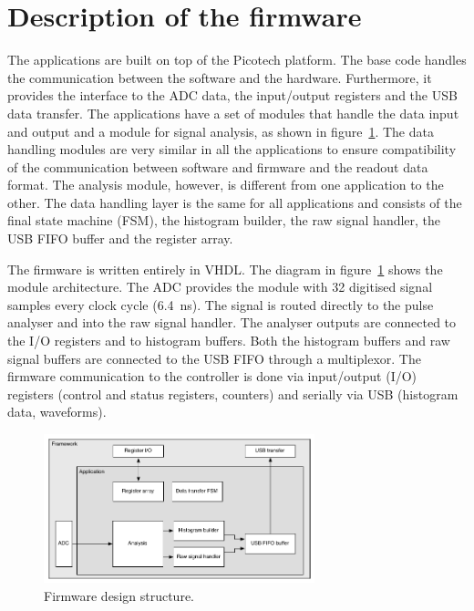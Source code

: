 \section{Description of the firmware}
The applications are built on top of the Picotech platform. The base code handles the communication between the software and the hardware. Furthermore, it provides the interface to the ADC data, the input/output registers and the USB data transfer. The applications have a set of modules that handle the data input and output and a module for signal analysis, as shown in figure~\ref{fig:application}. The data handling modules are very similar in all the applications to ensure compatibility of the communication between software and firmware and the readout data format. The analysis module, however, is different from one application to the other. The data handling layer is the same for all applications and consists of the final state machine (FSM), the histogram builder, the raw signal handler, the USB FIFO buffer and the register array.

The firmware is written entirely in VHDL. The diagram in figure~\ref{fig:application} shows the module architecture. The ADC provides the module with 32 digitised signal samples every clock cycle (6.4~ns). The signal is routed directly to the pulse analyser and into the raw signal handler. The analyser outputs are connected to the I/O registers and to histogram buffers. Both the histogram buffers and raw signal buffers are connected to the USB FIFO through a multiplexor. The firmware communication to the controller is done via input/output (I/O) registers (control and status registers, counters) and serially via USB (histogram data, waveforms). 


\begin{figure}[!t]
\centering
\includegraphics[width=0.7\textwidth]{05_current_monitoring/plots/application}
\caption{Firmware design structure.}
\label{fig:application}
\end{figure}


